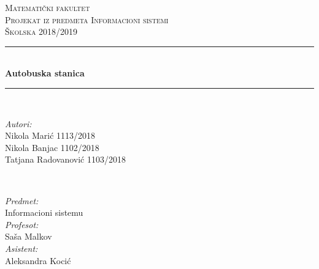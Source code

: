 \begin{titlepage}

\newcommand{\HRule}{\rule{\linewidth}{0.5mm}} %

\center %
 

\textsc{\LARGE Matematički fakultet}\\[1.5cm] %
\textsc{\Large Projekat iz predmeta Informacioni sistemi}\\[0.5cm] %
\textsc{\large Školska 2018/2019}\\[0.5cm] %


\HRule \\[0.4cm]
{ \huge \bfseries Autobuska stanica}\\[0.4cm] %
\HRule \\[2.cm]
 

\begin{minipage}{0.55\textwidth}
\begin{flushleft} \large
\emph{Autori:}\\
Nikola Mari\'c 1113/2018 \\%
Nikola Banjac 1102/2018 \\
Tatjana Radovanovi\'c 1103/2018
\end{flushleft}
\end{minipage}
~
\begin{minipage}{0.4\textwidth}
\begin{flushright} \large
\emph{Predmet:} \\
Informacioni sistemu\\%
\emph{Profesot:} \\
Sa\v sa Malkov\\
\emph{Asistent:} \\
Aleksandra Koci\'c\\
\end{flushright}
\end{minipage}\\[4cm]


\end{titlepage}
